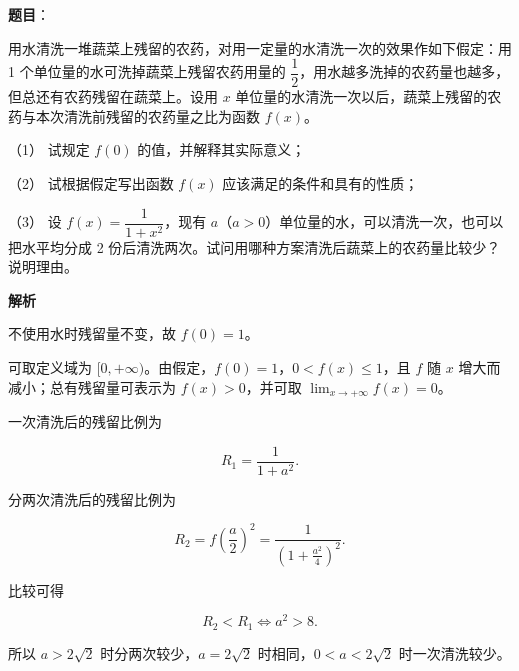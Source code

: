 \begin{answer}

\textbf{题目}：

用水清洗一堆蔬菜上残留的农药，对用一定量的水清洗一次的效果作如下假定：用 1 个单位量的水可洗掉蔬菜上残留农药用量的 $\dfrac12$，用水越多洗掉的农药量也越多，但总还有农药残留在蔬菜上。设用 $x$ 单位量的水清洗一次以后，蔬菜上残留的农药与本次清洗前残留的农药量之比为函数 $f(x)$。

（1） 试规定 $f(0)$ 的值，并解释其实际意义；

（2） 试根据假定写出函数 $f(x)$ 应该满足的条件和具有的性质；

（3） 设 $f(x)=\dfrac1{1+x^2}$，现有 $a$（$a>0$）单位量的水，可以清洗一次，也可以把水平均分成 2 份后清洗两次。试问用哪种方案清洗后蔬菜上的农药量比较少？说明理由。

\textbf{解析}


不使用水时残留量不变，故 $f(0)=1$。


可取定义域为 $[0,+\infty)$。由假定，$f(0)=1$，$0<f(x)\le1$，且 $f$ 随 $x$ 增大而减小；总有残留量可表示为 $f(x)>0$，并可取 $\lim_{x\to+\infty}f(x)=0$。


一次清洗后的残留比例为

\nopagebreak[4]
\[
R_1=\frac1{1+a^2}.
\]

分两次清洗后的残留比例为

\nopagebreak[4]
\[
R_2=f\left(\frac a2\right)^2
=\frac1{\left(1+\frac{a^2}{4}\right)^2}.
\]

比较可得

\nopagebreak[4]
\[
R_2<R_1\Longleftrightarrow a^2>8.
\]

所以 $a>2\sqrt2$ 时分两次较少，$a=2\sqrt2$ 时相同，$0<a<2\sqrt2$ 时一次清洗较少。


\gkanswer{答案（2）：可取定义域 $[0,+\infty)$；$f(0)=1$，$0<f(x)\le1$，且 $f$ 随 $x$ 增大而减小，通常还应有 $\displaystyle\lim_{x\to+\infty}f(x)=0$。}


\end{answer}
